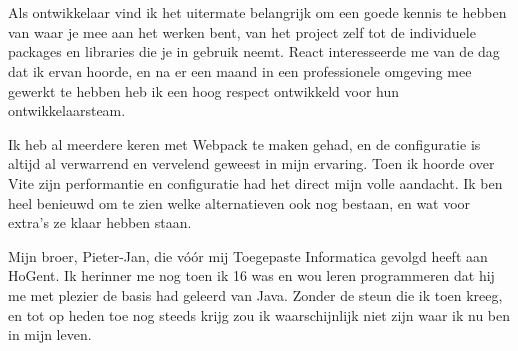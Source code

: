 
\chapter*{}
\label{ch:voorwoord}


Als ontwikkelaar vind ik het uitermate belangrijk om een goede kennis te hebben van waar je mee aan het werken bent, van het project zelf tot de individuele packages en libraries die je in gebruik neemt. React interesseerde me van de dag dat ik ervan hoorde, en na er een maand in een professionele omgeving mee gewerkt te hebben heb ik een hoog respect ontwikkeld voor hun ontwikkelaarsteam.

Ik heb al meerdere keren met Webpack te maken gehad, en de configuratie is altijd al verwarrend en vervelend geweest in mijn ervaring. Toen ik hoorde over Vite zijn performantie en configuratie had het direct mijn volle aandacht. Ik ben heel benieuwd om te zien welke alternatieven ook nog bestaan, en wat voor extra's ze klaar hebben staan.

\vspace{2cm}

Mijn broer, Pieter-Jan, die vóór mij Toegepaste Informatica gevolgd heeft aan HoGent. Ik herinner me nog toen ik 16 was en wou leren programmeren dat hij me met plezier de basis had geleerd van Java. Zonder de steun die ik toen kreeg, en tot op heden toe nog steeds krijg zou ik waarschijnlijk niet zijn waar ik nu ben in mijn leven.
